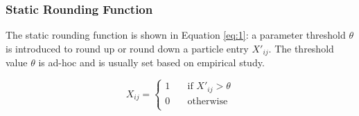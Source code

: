 \documentclass[10pt,journal,compsoc]{IEEEtran}
\begin{document}
\vspace{-3 mm}
\subsubsection{Static Rounding Function}

The static rounding function is shown in Equation \ref{eq:1}: a parameter threshold $\theta$ is introduced to round up or round down a particle entry $X'_{ij}$.
The threshold value $\theta$ is ad-hoc and is usually set based on empirical study.
\begin{small}
 \begin{equation}
  \label{eq:1}
  X_{ij} =
  \begin{cases}
   1 & \quad \text{if } X'_{ij} > \theta \\
   0 & \quad \text{otherwise} \\
  \end{cases}
 \end{equation}
 \end{small}
\vspace{-5 mm}
\end{document}
